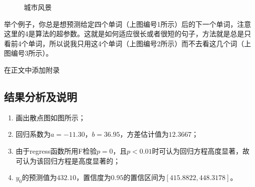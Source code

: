 \documentclass[UTF8,12pt,a4paper]{article}
\begin{document}
\begin{figure}[htbp]
	\quad
	\caption{城市风景}
\end{figure}


举个例子，你总是想预测给定四个单词（上图编号1所示）后的下一个单词，注意这里的4是算法的超参数。这就是如何适应很长或者很短的句子，方法就是总是只看前4个单词，所以说我只用这4个单词（上图编号2所示）而不去看这几个词（上图编号3所示）。

\begin{appendices}
在正文中添加附录
\end{appendices}

\subsection{结果分析及说明}
\begin{enumerate}
	\item 画出散点图如图所示；
	\item 回归系数为$a=-11.30$，$b=36.95$，方差估计值为$12.3667$；
	\item 由于regress函数所用F检验$p=0$，且$p<0.01$时可认为回归方程高度显著，故可认为该回归方程是高度显著的；
	\item $y_0$的预测值为$432.10$，置信度为$0.95$的置信区间为$[415.8822,448.3178]$。
\end{enumerate}
\end{document}

